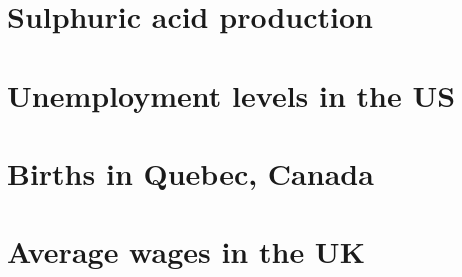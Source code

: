 
\section{Sulphuric acid production}


\section{Unemployment levels in the US}


\section{Births in Quebec, Canada}


\section{Average wages in the UK}


\outbpdocument{


}